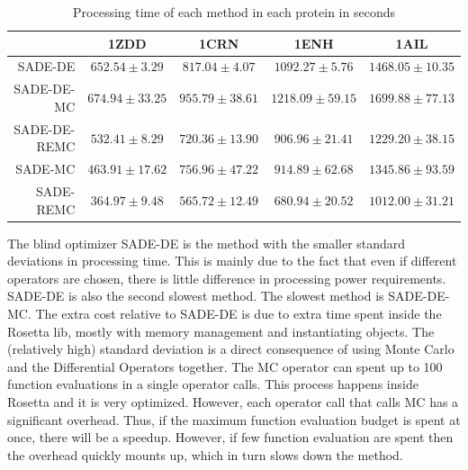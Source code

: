 \begin{table}[ht!]
  \centering
  \begin{tabular}{ r | c | c | c | c } \cline{2-5}
             & 1ZDD                  & 1CRN                  & 1ENH                  & 1AIL                  \\ \hline \hline
SADE-DE      & $ 652.54  \pm 3.29  $ & $ 817.04  \pm 4.07  $ & $ 1092.27 \pm 5.76  $ & $ 1468.05 \pm 10.35 $ \\ \hline
SADE-DE-MC   & $ 674.94  \pm 33.25 $ & $ 955.79  \pm 38.61 $ & $ 1218.09 \pm 59.15 $ & $ 1699.88 \pm 77.13 $ \\ \hline
SADE-DE-REMC & $ 532.41  \pm 8.29  $ & $ 720.36  \pm 13.90 $ & $ 906.96  \pm 21.41 $ & $ 1229.20 \pm 38.15 $ \\ \hline
SADE-MC      & $ 463.91  \pm 17.62 $ & $ 756.96  \pm 47.22 $ & $ 914.89  \pm 62.68 $ & $ 1345.86 \pm 93.59 $ \\ \hline
SADE-REMC    & $ 364.97  \pm 9.48  $ & $ 565.72  \pm 12.49 $ & $ 680.94  \pm 20.52 $ & $ 1012.00 \pm 31.21 $ \\ \hline \hline
  \end{tabular}
  \caption{Processing time of each method in each protein in seconds}
  \label{tab:processing-times}
\end{table}

The blind optimizer SADE-DE is the method with the smaller standard deviations in processing time.
This is mainly due to the fact that even if different operators are chosen, there is little difference
in processing power requirements. SADE-DE is also the second slowest method. The slowest method
is SADE-DE-MC. The extra cost relative to SADE-DE is due to extra time spent inside the Rosetta lib,
mostly with memory management and instantiating objects. The (relatively high) standard deviation
is a direct consequence of using Monte Carlo and the Differential Operators together. The
MC operator can spent up to 100 function evaluations in a single operator calls. This process
happens inside Rosetta and it is very optimized. However, each operator call that calls MC
has a significant overhead. Thus, if the maximum function evaluation budget is spent at once,
there will be a speedup. However, if few function evaluation are spent then the overhead quickly
mounts up, which in turn slows down the method.


